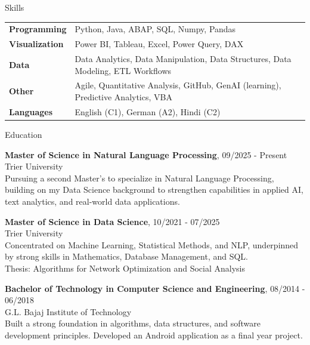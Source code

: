 \documentclass{resume} %
\begin{document}
\vspace{0.3cm}
\begin{rSection}{Skills}
\begin{tabular}{ @{} >{\bfseries}l @{\hspace{6ex}} l }
Programming & Python, Java, ABAP, SQL, Numpy, Pandas \\
Visualization & Power BI, Tableau, Excel, Power Query, DAX \\
Data & Data Analytics, Data Manipulation, Data Structures, Data Modeling, ETL Workflows \\
Other & Agile, Quantitative Analysis, GitHub, GenAI (learning), Predictive Analytics, VBA \\
Languages & English (C1), German (A2), Hindi (C2)
\end{tabular}
\end{rSection}

\vspace{1cm}
\begin{rSection}{Education}

{\bf Master of Science in Natural Language Processing}, \hfill {09/2025 - Present}\\
Trier University\\
Pursuing a second Master’s to specialize in Natural Language Processing, building on my Data Science background to strengthen capabilities in applied AI, text analytics, and real-world data applications.

\vspace{0.4cm}
{\bf Master of Science in Data Science}, \hfill {10/2021 - 07/2025}\\
Trier University\\ 
Concentrated on Machine Learning, Statistical Methods, and NLP, underpinned by strong skills in Mathematics, Database Management, and SQL. \\
Thesis: Algorithms for Network Optimization and Social Analysis

\vspace{0.4cm}

{\bf Bachelor of Technology in Computer Science and Engineering},  \hfill {08/2014 - 06/2018} \\
G.L. Bajaj Institute of Technology\\
Built a strong foundation in algorithms, data structures, and software development principles. Developed an Android application as a final year project.
\end{rSection}
\end{document}
